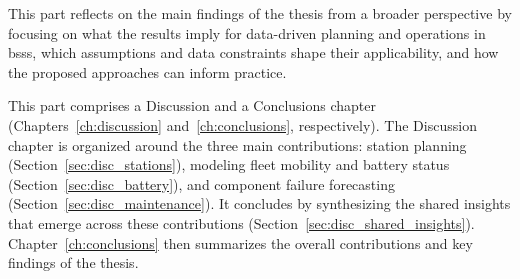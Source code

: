 This part reflects on the main findings of the thesis from a broader perspective by focusing on what the results imply for data-driven planning and operations in \acp{bss}, which assumptions and data constraints shape their applicability, and how the proposed approaches can inform practice.

This part comprises a Discussion and a Conclusions chapter (Chapters~\ref{ch:discussion} and~\ref{ch:conclusions}, respectively). The Discussion chapter is organized around the three main contributions: station planning (Section~\ref{sec:disc_stations}), modeling fleet mobility and battery status (Section~\ref{sec:disc_battery}), and component failure forecasting (Section~\ref{sec:disc_maintenance}). It concludes by synthesizing the shared insights that emerge across these contributions (Section~\ref{sec:disc_shared_insights}). Chapter~\ref{ch:conclusions} then summarizes the overall contributions and key findings of the thesis.



    


% 

